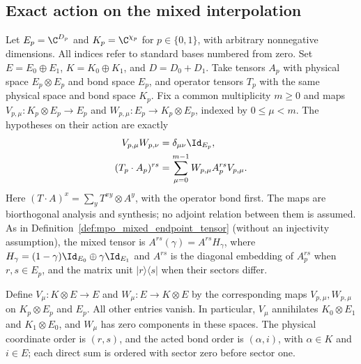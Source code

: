 
\subsection{Exact action on the mixed interpolation}
\label{sec:mpo_mixed_action}

Let $E_p=\C^{D_p}$ and $K_p=\C^{\chi_p}$ for $p\in\{0,1\}$,
with arbitrary nonnegative dimensions. All indices refer to standard
bases numbered from zero. Set $E=E_0\oplus E_1$,
$K=K_0\oplus K_1$, and $D=D_0+D_1$.
Take tensors $A_p$ with physical space $E_p\otimes E_p$ and bond
space $E_p$, and operator tensors $T_p$ with the same physical space
and bond space $K_p$. Fix a common multiplicity $m\geq0$ and maps
$V_{p,\mu}:K_p\otimes E_p\to E_p$ and
$W_{p,\mu}:E_p\to K_p\otimes E_p$, indexed by $0\leq\mu<m$.
The hypotheses on their action are exactly
\begin{align}
    V_{p,\mu}W_{p,\nu} & =\delta_{\mu\nu}\Id_{E_p},
    \label{eq:mpo_mix_action_retract}                                   \\
    (T_p\cdot A_p)^{rs}
                       & =\sum_{\mu=0}^{m-1}W_{p,\mu}A_p^{rs}V_{p,\mu}.
    \label{eq:mpo_mix_action_input}
\end{align}
Here $(T\cdot A)^x=\sum_y T^{xy}\otimes A^y$, with the
operator bond first. The maps are biorthogonal analysis and synthesis;
no adjoint relation between them is assumed. As in
Definition~\ref{def:mpo_mixed_endpoint_tensor} (without an injectivity
assumption), the mixed tensor is $A^{rs}(\gamma)=A^{rs}H_\gamma$, where
$H_\gamma=(1-\gamma)\Id_{E_0}\oplus\gamma\Id_{E_1}$ and $A^{rs}$ is
the diagonal embedding of $A_p^{rs}$ when $r,s\in E_p$, and the matrix
unit $|r\rangle\langle s|$ when their sectors differ.

\begin{definition}
    \label{def:mpo_mixed_action_maps}
    \leanok
    Define $V_\mu:K\otimes E\to E$ and $W_\mu:E\to K\otimes E$
    by the corresponding maps $V_{p,\mu},W_{p,\mu}$ on
    $K_p\otimes E_p$ and $E_p$. All other entries vanish.
    In particular, $V_\mu$ annihilates $K_0\otimes E_1$ and
    $K_1\otimes E_0$, and $W_\mu$ has zero components in these spaces.
    The physical coordinate order is $(r,s)$, and the acted bond order
    is $(\alpha,i)$, with $\alpha\in K$ and $i\in E$; each direct sum
    is ordered with sector zero before sector one.
\end{definition}

